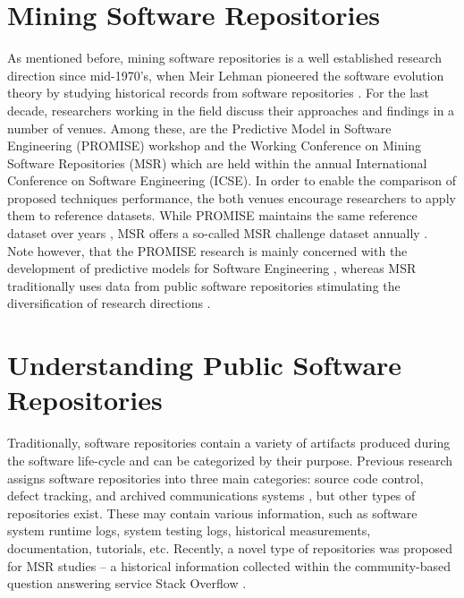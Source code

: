 \section{Mining Software Repositories}
As mentioned before, mining software repositories is a well established research direction since 
mid-1970's, when Meir Lehman pioneered the software evolution theory by studying historical records from 
software repositories \cite{citeulike:2739216}. 
For the last decade, researchers working in the field discuss their approaches and findings in a number of venues. 
Among these, are the Predictive Model in Software Engineering (PROMISE) workshop and the Working Conference on Mining 
Software Repositories (MSR) which are held within the annual International Conference on Software Engineering (ICSE).
In order to enable the comparison of proposed techniques performance, the both venues encourage researchers to 
apply them to reference datasets. 
While PROMISE maintains the same reference dataset over years \cite{promise12}, 
MSR offers a so-called MSR challenge dataset annually \cite{MSRChallenge2012} \cite{MSRChallenge2013}.
Note however, that the {PROMISE} research is mainly concerned with the development of predictive models for 
Software Engineering \cite{Menzies13}, whereas MSR traditionally uses data from public software repositories stimulating 
the diversification of research directions \cite{citeulike:12550438} \cite{citeulike:2710928} \cite{citeulike:7853299}.

\section{Understanding Public Software Repositories}\label{section_understanding}
Traditionally, software repositories contain a variety of artifacts produced during the software life-cycle
and can be categorized by their purpose.
Previous research assigns software repositories into three main categories: source code control, 
defect tracking, and archived communications systems \cite{citeulike:4534888}, but other types of repositories exist. 
These may contain various information, such as software system runtime logs, system testing logs, 
historical measurements, documentation, tutorials, etc.
Recently, a novel type of repositories was proposed for MSR studies -- a historical information collected within the 
community-based question answering service Stack Overflow \cite{MSRChallenge2013}.

